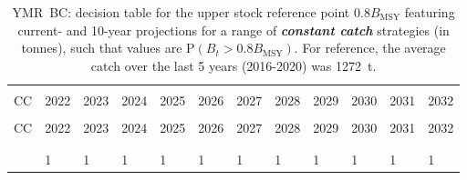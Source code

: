 \documentclass[11pt]{book}
\newcommand{\Bmsy}{B_\text{MSY}}
\newcommand{\itbf}[1]{\textit{\textbf{#1}}}
\begin{document}
\begin{longtable}[c]{>{\raggedright\let\newline\\\arraybackslash\hspace{0pt}}p{0.5in}>{\raggedleft\let\newline\\\arraybackslash\hspace{0pt}}p{0.5in}>{\raggedleft\let\newline\\\arraybackslash\hspace{0pt}}p{0.5in}>{\raggedleft\let\newline\\\arraybackslash\hspace{0pt}}p{0.53in}>{\raggedleft\let\newline\\\arraybackslash\hspace{0pt}}p{0.53in}>{\raggedleft\let\newline\\\arraybackslash\hspace{0pt}}p{0.53in}>{\raggedleft\let\newline\\\arraybackslash\hspace{0pt}}p{0.53in}>{\raggedleft\let\newline\\\arraybackslash\hspace{0pt}}p{0.53in}>{\raggedleft\let\newline\\\arraybackslash\hspace{0pt}}p{0.53in}>{\raggedleft\let\newline\\\arraybackslash\hspace{0pt}}p{0.53in}>{\raggedleft\let\newline\\\arraybackslash\hspace{0pt}}p{0.53in}>{\raggedleft\let\newline\\\arraybackslash\hspace{0pt}}p{0.53in}}
  \caption{YMR~BC: decision table for the upper stock reference point $0.8 \Bmsy$ featuring current- and 10-year projections for a range of \itbf{constant catch} strategies (in tonnes), such that values are P$(B_t > 0.8 \Bmsy)$.  For reference, the average catch over the last 5 years (2016-2020) was 1272~t. } \label{tab:ymr.gmu.USR.CCs}\\  \hline\\[-2.2ex]  CC  & 2022 & 2023 & 2024 & 2025 & 2026 & 2027 & 2028 & 2029 & 2030 & 2031 & 2032 \\[0.2ex]\hline\\[-1.5ex]  \endfirsthead   \hline  CC  & 2022 & 2023 & 2024 & 2025 & 2026 & 2027 & 2028 & 2029 & 2030 & 2031 & 2032 \\[0.2ex]\hline\\[-1.5ex]  \endhead  \hline\\[-2.2ex]   \endfoot  \hline \endlastfoot  0 & 1 & 1 & 1 & 1 & 1 & 1 & 1 & 1 & 1 & 1 & 1 \\ 

\end{longtable}
\end{document}
